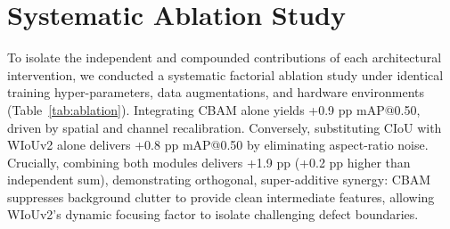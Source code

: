 \documentclass{llncs}
\begin{document}
\section{Systematic Ablation Study}
To isolate the independent and compounded contributions of each architectural intervention, we conducted a systematic factorial ablation study under identical training hyper-parameters, data augmentations, and hardware environments (Table~\ref{tab:ablation}). Integrating CBAM alone yields +0.9 pp mAP@0.50, driven by spatial and channel recalibration. Conversely, substituting CIoU with WIoUv2 alone delivers +0.8 pp mAP@0.50 by eliminating aspect-ratio noise. Crucially, combining both modules delivers +1.9 pp (+0.2 pp higher than independent sum), demonstrating orthogonal, super-additive synergy: CBAM suppresses background clutter to provide clean intermediate features, allowing WIoUv2's dynamic focusing factor to isolate challenging defect boundaries.

\begin{table}[!htbp]
\centering
\caption{Factorial Ablation Analysis of Proposed Architectural Modules on DeepPCB.}
\label{tab:ablation}
\end{table}

\end{document}
